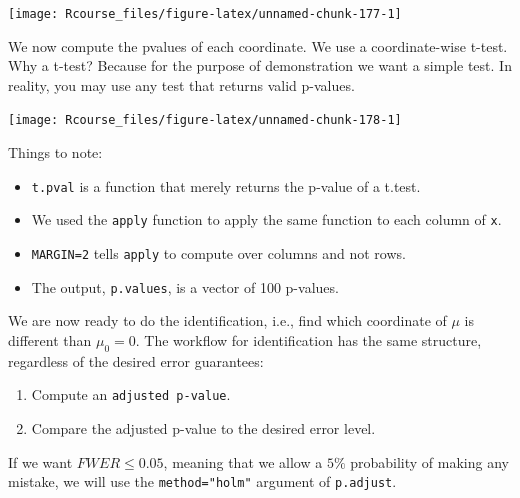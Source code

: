 \documentclass[]{book}
\newenvironment{Shaded}{\begin{snugshade}}{\end{snugshade}}
\newcommand{\KeywordTok}[1]{\textcolor[rgb]{0.13,0.29,0.53}{\textbf{#1}}}
\newcommand{\DataTypeTok}[1]{\textcolor[rgb]{0.13,0.29,0.53}{#1}}
\newcommand{\DecValTok}[1]{\textcolor[rgb]{0.00,0.00,0.81}{#1}}
\newcommand{\StringTok}[1]{\textcolor[rgb]{0.31,0.60,0.02}{#1}}
\newcommand{\ControlFlowTok}[1]{\textcolor[rgb]{0.13,0.29,0.53}{\textbf{#1}}}
\newcommand{\OperatorTok}[1]{\textcolor[rgb]{0.81,0.36,0.00}{\textbf{#1}}}
\newcommand{\NormalTok}[1]{#1}
\providecommand{\tightlist}{%
  \setlength{\itemsep}{0pt}\setlength{\parskip}{0pt}}
\theoremstyle{definition}
\theoremstyle{definition}
\theoremstyle{definition}
\theoremstyle{remark}
\begin{document}
\texttt{[image: Rcourse\_files/figure-latex/unnamed-chunk-177-1]}

We now compute the pvalues of each coordinate. We use a coordinate-wise
t-test. Why a t-test? Because for the purpose of demonstration we want a
simple test. In reality, you may use any test that returns valid
p-values.

\begin{Shaded}
\end{Shaded}

\texttt{[image: Rcourse\_files/figure-latex/unnamed-chunk-178-1]}

Things to note:

\begin{itemize}
\tightlist
\item
  \texttt{t.pval} is a function that merely returns the p-value of a
  t.test.
\item
  We used the \texttt{apply} function to apply the same function to each
  column of \texttt{x}.
\item
  \texttt{MARGIN=2} tells \texttt{apply} to compute over columns and not
  rows.
\item
  The output, \texttt{p.values}, is a vector of 100 p-values.
\end{itemize}

We are now ready to do the identification, i.e., find which coordinate
of \(\mu\) is different than \(\mu_0=0\). The workflow for
identification has the same structure, regardless of the desired error
guarantees:

\begin{enumerate}
\def\labelenumi{\arabic{enumi}.}
\tightlist
\item
  Compute an \texttt{adjusted\ p-value}.
\item
  Compare the adjusted p-value to the desired error level.
\end{enumerate}

If we want \(FWER \leq 0.05\), meaning that we allow a \(5\%\)
probability of making any mistake, we will use the
\texttt{method="holm"} argument of \texttt{p.adjust}.
\end{document}
